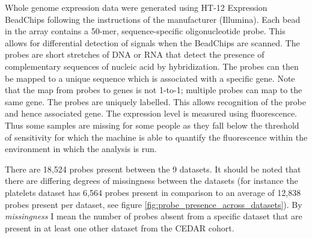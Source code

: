 \documentclass[12pt]{article} %
\begin{document}
	Whole genome expression data were generated using HT-12 Expression BeadChips following the instructions of the manufacturer (Illumina). Each bead in the array contains a 50-mer, sequence-specific oligonucleotide probe. This allows for differential detection of signals when the BeadChips are scanned. The probes are short stretches of DNA or RNA that detect the presence of complementary sequences of nucleic acid by hybridization. The probes can then be mapped to a unique sequence which is associated with a specific gene. Note that the map from probes to genes is not 1-to-1; multiple probes can map to the same gene. The probes are uniquely labelled. This allows recognition of the probe and hence associated gene. The expression level is measured using fluorescence. Thus some samples are missing for some people as they fall below the threshold of sensitivity for which the machine is able to quantify the fluorescence within the environment in which the analysis is run.
	
	There are 18,524 probes present between the 9 datasets. It should be noted that there are differing degrees of missingness between the datasets (for instance the platelets dataset has 6,564 probes present in comparison to an average of 12,838 probes present per dataset, see figure \ref{fig:probe_presence_across_datasets}). By \emph{missingness} I mean the number of probes absent from a specific dataset that are present in at least one other dataset from the CEDAR cohort.
	
\end{document}
